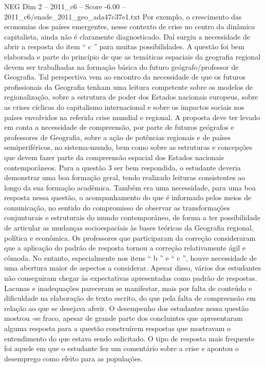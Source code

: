 \begin{textsample}{NEG Dim 2 – 2011\_c6 – Score -6.00 – 2011\_c6/enade\_2011\_geo\_ada47c37e1.txt}
Por exemplo, o crescimento das economias dos países emergentes, nesse contexto de crise no centro da dinâmica capitalista, ainda não é claramente diagnosticado.
Daí surgiu a necessidade de abrir a resposta do item “ c ” para muitas possibilidades.
A questão foi bem elaborada e parte do princípio de que as temáticas espaciais da geografia regional devem ser trabalhadas na formação básica do futuro geógrafo/professor de Geografia.
Tal perspectiva vem ao encontro da necessidade de que os futuros profissionais da Geografia tenham uma leitura competente sobre os modelos de regionalização, sobre a estrutura de poder dos Estados nacionais europeus, sobre as crises cíclicas do capitalismo internacional e sobre os impactos sociais nos países envolvidos na referida crise mundial e regional.
A proposta deve ter levado em conta a necessidade de compreensão, por parte de futuros geógrafos e professores de Geografia, sobre a ação de potências regionais e de países semiperiféricos, no sistema-mundo, bem como sobre as estruturas e concepções que devem fazer parte da compreensão espacial dos Estados nacionais contemporâneos.
Para a questão 3 ser bem respondida, o estudante deveria demonstrar uma boa formação geral, tendo realizado leituras consistentes ao longo da sua formação acadêmica.
Também era uma necessidade, para uma boa resposta nessa questão, o acompanhamento do que é informado pelos meios de comunicação, no sentido do compromisso de observar as transformações conjunturais e estruturais do mundo contemporâneo, de forma a ter possibilidade de articular as mudanças socioespaciais às bases teóricas da Geografia regional, política e econômica.
Os professores que participaram da correção consideraram que a aplicação do padrão de resposta tornou a correção relativamente ágil e cômoda.
No entanto, especialmente nos itens “ b ” e “ c ”, houve necessidade de uma abertura maior de aspectos a considerar.
Apesar disso, vários dos estudantes não conseguiram chegar às expectativas apresentadas como padrão de respostas.
Lacunas e inadequações pareceram se manifestar, mais por falta de conteúdo e dificuldade na elaboração de texto escrito, do que pela falta de compreensão em relação ao que se desejava aferir.
O desempenho dos estudantes nessa questão mostrou -se fraco, apesar de grande parte dos concluintes que apresentaram alguma resposta para a questão construírem respostas que mostravam o entendimento do que estava sendo solicitado.
O tipo de resposta mais frequente foi aquele em que o estudante fez um comentário sobre a crise e apontou o desemprego como efeito para as populações.

\end{textsample}
